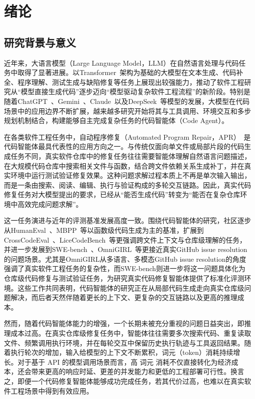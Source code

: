 
\chapter{绪论}

\section{研究背景与意义}

近年来，大语言模型（Large Language Model，LLM）在自然语言处理与代码任务中取得了显著进展。以Transformer~\cite{vaswani2017attention}架构为基础的大模型在文本生成、代码补全、程序理解、测试生成与缺陷修复等任务上展现出较强能力，推动了软件工程研究从“模型直接生成代码”逐步迈向“模型驱动复杂软件工程流程”的新阶段。特别是随着ChatGPT~\cite{ChatGPT}、Gemini~\cite{Gemini}、Claude~\cite{Claude}以及DeepSeek~\cite{bi2024deepseek}等模型的发展，大模型在代码场景中的应用边界不断扩展，越来越多研究开始将其与工具调用、环境交互和多步规划机制结合，构建能够自主完成复杂任务的代码智能体（Code Agent）。

在各类软件工程任务中，自动程序修复（Automated Program Repair，APR）~\cite{le2021automatic}是代码智能体最具代表性的应用方向之一。与传统仅面向单文件或局部片段的代码生成任务不同，真实软件仓库中的修复任务往往需要智能体理解自然语言问题描述，在大规模代码仓库中搜索相关文件与函数，结合跨文件依赖关系生成补丁，并在真实环境中运行测试验证修复效果。这种问题求解过程本质上不再是单次输入输出，而是一条由搜索、阅读、编辑、执行与验证构成的多轮交互链路。因此，真实代码修复任务对大模型提出的要求，已经从“能否生成代码”转变为“能否在复杂仓库环境中高效完成问题求解”。

这一任务演进与近年的评测基准发展高度一致。围绕代码智能体的研究，社区逐步从HumanEval~\cite{chen2021evaluating}、MBPP~\cite{austin2021program}等以函数级代码生成为主的基准，扩展到CrossCodeEval~\cite{ding2023crosscodeeval}、LiceCodeBench~\cite{jain2024livecodebench}等更强调跨文件上下文与仓库级理解的任务，并进一步发展到SWE-bench~\cite{jimenez2023swebench}、OmniGIRL~\cite{guo2025omnigirl}等更接近真实GitHub issue resolution的问题场景。尤其是OmniGIRL从多语言、多模态GitHub issue resolution的角度强调了真实软件工程任务的复杂性，而SWE-bench则进一步将这一问题具体化为仓库级代码修复与测试验证任务，为研究真实代码修复智能体提供了标准化评测环境。这些工作共同表明，代码智能体的研究正在从局部代码生成走向真实仓库级问题解决，而后者天然伴随着更长的上下文、更复杂的交互链路以及更高的推理成本。

然而，随着代码智能体能力的增强，一个长期未被充分重视的问题日益突出，即推理成本过高。在真实仓库级修复任务中，智能体往往需要多次搜索代码、重复读取文件、频繁调用执行环境，并在每轮交互中保留历史执行轨迹与工具返回结果。随着执行轮次的增加，输入给模型的上下文不断累积，词元（token）消耗持续增长。对于基于 API 的模型调用场景而言，高 词元 消耗不仅直接转化为经济成本，还会带来更高的响应时延、更差的并发能力和更低的工程部署可行性。换言之，即便一个代码修复智能体能够成功完成任务，若其代价过高，也难以在真实软件工程场景中得到有效应用。

